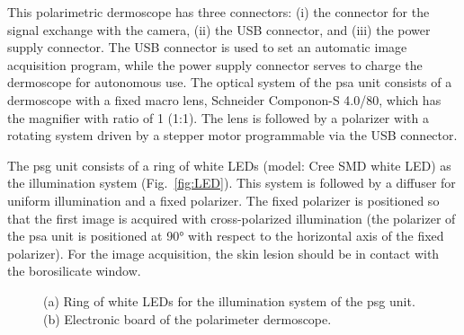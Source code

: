 This polarimetric dermoscope has three connectors: (i) the connector for the signal exchange with the camera, (ii) the USB connector, and (iii) the power supply connector.
The USB connector is used to set an automatic image acquisition program, while the power supply connector serves to charge the dermoscope for autonomous use.
The optical system of the \ac{psa} unit consists of a dermoscope with a fixed macro lens, Schneider Componon-S 4.0/80, which has the magnifier with ratio of 1 (1:1).
The lens is followed by a polarizer with a rotating system driven by a stepper motor programmable via the USB connector.

The \ac{psg} unit consists of a ring of white LEDs (model: Cree SMD white LED) as the illumination system (Fig.~\ref{fig:LED}).
This system is followed by a diffuser for uniform illumination and a fixed polarizer.
The fixed polarizer is positioned so that the first image is acquired with cross-polarized illumination (the polarizer of the \ac{psa} unit is positioned at \ang{90} with respect to the horizontal axis of the fixed polarizer).
For the image acquisition, the skin lesion should be in contact with the borosilicate window.

\begin{figure}
	\begin{center}
	\end{center}
	\caption[The illumination system and electronic board of the polarimetric dermoscope]{(a) Ring of white LEDs for the illumination system of the \ac{psg} unit. (b) Electronic board of the polarimeter dermoscope.}
	\label{fig:LED_EC}
\end{figure}

